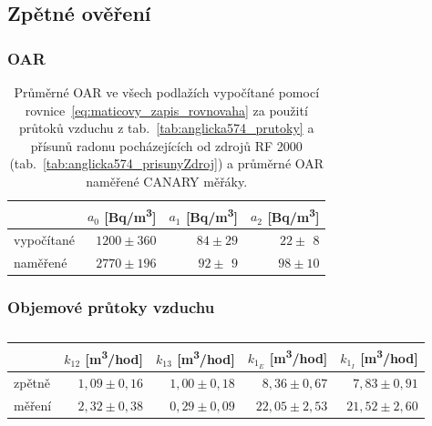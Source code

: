 \subsection{Zpětné ověření}
\subsubsection{OAR}
\begin{table}[H]
    \centering
    \caption{Průměrné OAR ve všech podlažích vypočítané pomocí rovnice~\eqref{eq:maticovy_zapis_rovnovaha} za použití průtoků vzduchu z tab.~\ref{tab:anglicka574_prutoky} a přísunů radonu pocházejících od zdrojů RF 2000 (tab.~\ref{tab:anglicka574_prisunyZdroj}) a průměrné OAR naměřené CANARY měřáky.}
    \label{tab:anglicka574_OAR_zpetne}
    \begin{tabular}{lrrr}
        \toprule
        & $a_0$ [\si{Bq/m^3}] &  $a_1$ [\si{Bq/m^3}]& $a_2$ [\si{Bq/m^3}]\\
        \midrule
       vypočítané & $1200\pm360$    & $84\pm29$ & $22\pm\ \,8$\\
       naměřené & $2770\pm196$ & $92\pm\ \,9$& $98\pm10$\\
        \bottomrule
    \end{tabular}
\end{table}
\subsubsection{Objemové průtoky vzduchu}

\begin{table}[H]
    \centering
    \caption{}
    \label{tab:anglicka574_prutoky1_zpetne}
    \begin{tabular}{lrrrr}
        \toprule
        & $k_{12}$ [\si{m^3/hod}] &  $k_{13}$ [\si{m^3/hod}]&  $k_{1_E}$ [\si{m^3/hod}]&  $k_{1_I}$ [\si{m^3/hod}]\\
        \midrule

         zpětně& $1,09\pm0,16$ &    $1,00\pm0,18$ &     $8,36\pm0,67$ &     $7,83\pm0,91$ \\
       měření & $2,32\pm0,38$ & $0,29\pm0,09$& $22,05\pm2,53$ &$21,52\pm2,60$\\
        \bottomrule
    \end{tabular}
\end{table}
